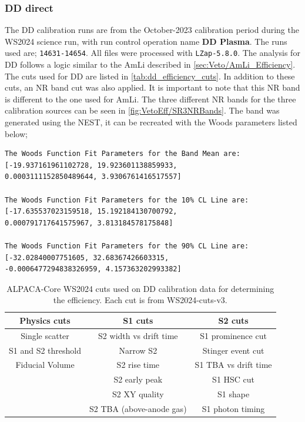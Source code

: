 \subsubsection{DD direct}
The DD calibration runs are from the October-2023 calibration period during the WS2024 science run, with run control operation name \textbf{DD Plasma}.
The runs used are; \lstinline{14631-14654}.
All files were processed with \lstinline{LZap-5.8.0}.
The analysis for DD follows a logic similar to the AmLi described in \autoref{sec:Veto/AmLi_Efficiency}.
The cuts used for DD are listed in \autoref{tab:dd_efficiency_cuts}.
In addition to these cuts, an NR band cut was also applied.
It is important to note that this NR band is different to the one used for AmLi. The three different NR bands for the three calibration sources can be seen in \autoref{fig:VetoEff/SR3NRBands}.
The band was generated using the NEST, it can be recreated with the Woods parameters listed below;
\begin{lstlisting}[backgroundcolor = \color{lightgray}]
The Woods Function Fit Parameters for the Band Mean are:
[-19.937161961102728, 19.923601138859933,
0.0003111152850489644, 3.9306761416517557]

The Woods Function Fit Parameters for the 10% CL Line are:
[-17.635537023159518, 15.192184130700792,
0.000791717641575967, 3.813184578175848]

The Woods Function Fit Parameters for the 90% CL Line are:
[-32.02840007751605, 32.68367426603315,
-0.0006477294838326959, 4.157363202993382]
\end{lstlisting}
\begin{table}
	\centering
	\begin{tabular}{|c|c|c|}
    \hline
	\textbf{Physics cuts}&\textbf{ S1 cuts}&\textbf{S2 cuts} \\
	\hline
	Single scatter & S2 width vs drift time & S1 prominence cut \\
	S1 and S2 threshold & Narrow S2 & Stinger event cut \\
	Fiducial Volume & S2 rise time & S1 TBA vs drift time \\
	& S2 early peak & S1 HSC cut \\
	& S2 XY quality & S1 shape \\
	& S2 TBA (above-anode gas) & S1 photon timing \\
    \hline
	\end{tabular}
	\caption{ALPACA-Core WS2024 cuts used on DD calibration data for determining the efficiency. Each cut is from WS2024-cuts-v3.}
	\label{tab:dd_efficiency_cuts}
\end{table}
